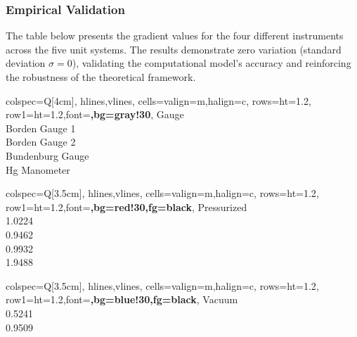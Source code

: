 \documentclass{article}
\begin{document}
\subsubsection{Empirical Validation}\label{empirical-validation}
The table below presents the gradient values for the four different instruments across the five unit systems. The results demonstrate zero variation (standard deviation $\sigma = 0$), validating the computational model's accuracy and reinforcing the robustness of the theoretical framework.


\begin{center}
	\begin{minipage}[t]{3cm}
		\centering
		\begin{tblr}{
				colspec={Q[4cm]},
				hlines,vlines,
				cells={valign=m,halign=c},
				rows={ht=1.2\baselineskip},
				row{1}={ht=1.2\baselineskip,font=\bfseries,bg=gray!30},
			}
			Gauge \\
			Borden Gauge 1 \\
			Borden Gauge 2 \\
			Bundenburg Gauge \\
			Hg Manometer \\
		\end{tblr}
	\end{minipage}
	\hspace{3.5em}
	\begin{minipage}[t]{3.5cm}
		\centering
		\begin{tblr}{
				colspec={Q[3.5cm]},
				hlines,vlines,
				cells={valign=m,halign=c},
				rows={ht=1.2\baselineskip},
				row{1}={ht=1.2\baselineskip,font=\bfseries,bg=red!30,fg=black},
			}
			Pressurized \\
			{1.0224}\\ 
			{0.9462} \\ 
			{0.9932} \\
			{1.9488} \\
		\end{tblr}
	\end{minipage}
	\hspace{1em}
	\begin{minipage}[t]{3.5cm}
		\centering
		\begin{tblr}{
				colspec={Q[3.5cm]},
				hlines,vlines,
				cells={valign=m,halign=c},
				rows={ht=1.2\baselineskip},
				row{1}={ht=1.2\baselineskip,font=\bfseries,bg=blue!30,fg=black},
			}
			Vacuum \\
			{0.5241} \\
			{0.9509} \\

\end{tblr}
\end{minipage}
\end{center}
\end{document}
